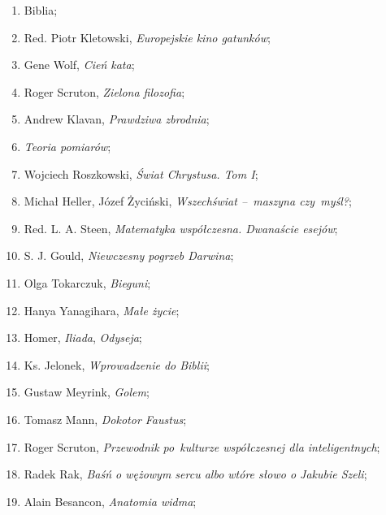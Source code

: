 \documentclass[a4paper,11pt]{article}
\begin{document}
\begin{enumerate}

\item Biblia;

\item Red. Piotr Kletowski, \emph{Europejskie kino gatunków};

\item Gene Wolf, \emph{Cień kata};

\item Roger Scruton, \emph{Zielona filozofia};

\item Andrew Klavan, \emph{Prawdziwa zbrodnia};

\item \emph{Teoria pomiarów};

\item Wojciech Roszkowski, \emph{Świat Chrystusa. Tom I};

\item Michał Heller, Józef Życiński, \emph{Wszechświat --~maszyna
    czy~myśl?};

\item Red. L. A. Steen, \emph{Matematyka współczesna. Dwanaście
    esejów};

\item S. J. Gould, \emph{Niewczesny pogrzeb Darwina};

\item Olga Tokarczuk, \emph{Bieguni};

\item Hanya Yanagihara, \emph{Małe życie};

\item Homer, \emph{Iliada}, \emph{Odyseja};

\item Ks. Jelonek, \emph{Wprowadzenie do Biblii};

\item Gustaw Meyrink, \emph{Golem};

\item Tomasz Mann, \emph{Dokotor Faustus};

\item Roger Scruton, \emph{Przewodnik po~kulturze współczesnej dla
    inteligentnych};

\item Radek Rak, \emph{Baśń o wężowym sercu albo wtóre słowo o Jakubie
    Szeli};

\item Alain Besancon, \emph{Anatomia widma};


\end{enumerate}
\end{document}
